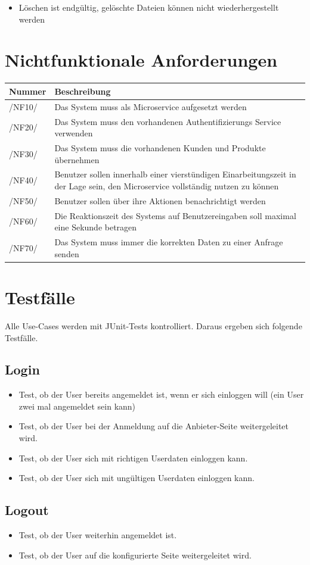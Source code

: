 \documentclass[a4paper,12pt]{article}
\newcommand\addrow[2]{#1 &#2\\ }
\newcommand\addheading[2]{#1 &#2\\ \hline}
\newcommand\tabularhead{\begin{tabular}{lp{13cm}}
\hline
}
\newenvironment{usecase}{\tabularhead}
{\hline\end{tabular}}
\begin{document}
\begin{itemize}

\item
  Löschen ist endgültig, gelöschte Dateien können nicht
  wiederhergestellt werden
\end{itemize}

\section{Nichtfunktionale Anforderungen}
\begin{usecase}
  \addheading{Nummer}{Beschreibung} 
  \addrow{/NF10/}{Das System muss als Microservice aufgesetzt werden}  
  \addrow{/NF20/}{Das System muss den vorhandenen Authentifizierungs Service verwenden}
  \addrow{/NF30/}{Das System muss die vorhandenen Kunden und Produkte übernehmen}
  \addrow{/NF40/}{Benutzer sollen innerhalb einer vierstündigen Einarbeitungszeit in der Lage sein, den Microservice vollständig nutzen zu können}
  \addrow{/NF50/}{Benutzer sollen über ihre Aktionen benachrichtigt werden}
  \addrow{/NF60/}{Die Reaktionszeit des Systems auf Benutzereingaben soll maximal eine Sekunde betragen}
  \addrow{/NF70/}{Das System muss immer die korrekten Daten zu einer Anfrage senden}
\end{usecase}

\clearpage

\section{Testfälle}
Alle Use-Cases werden mit JUnit-Tests kontrolliert. Daraus ergeben sich folgende Testfälle.

\subsection{Login}
\begin{itemize}
\item Test, ob der User bereits angemeldet ist, wenn er sich einloggen will (ein User zwei mal angemeldet sein kann)
\item Test, ob der User bei der Anmeldung auf die Anbieter-Seite weitergeleitet wird. 
\item Test, ob der User sich mit richtigen Userdaten einloggen kann.
\item Test, ob der User sich mit ungültigen Userdaten einloggen kann.
\end{itemize}

\subsection{Logout}
\begin{itemize}
\item Test, ob der User weiterhin angemeldet ist.
\item Test, ob der User auf die konfigurierte Seite weitergeleitet wird.
\end{itemize}
\end{document}
